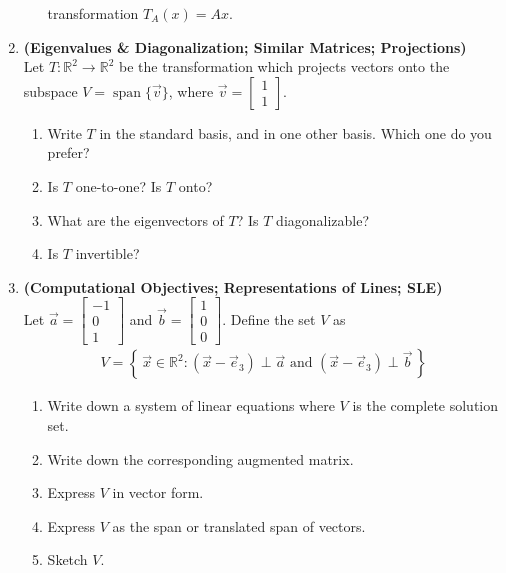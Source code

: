 \documentclass[red]{tutorial}
\newcommand{\R}{\mathbb{R}}
\newcommand{\mat}[1]{\begin{bmatrix} #1 %
\end{bmatrix}}
\DeclareMathOperator{\Span} {span}
\theoremstyle{definition}
\theoremstyle{theorem}
\begin{document}
\begin{tutorial}
\begin{enumerate}
\begin{enumerate}
          transformation $T_A(x) = Ax$.
      \end{enumerate}
    \item \textbf{(Eigenvalues \& Diagonalization; Similar Matrices;
      Projections)}\\
      Let $T\colon\R^2\to\R^2$ be the transformation which
      projects vectors onto the subspace $V=\Span\{\vec v\}$,
      where $\vec v = \mat{1\\1}$.
      \begin{enumerate}
        \item \label{q:standard_basis}
          Write $T$ in the standard basis, and in one other basis. Which one do
          you prefer?
        \item Is $T$ one-to-one? Is $T$ onto?
        \item What are the eigenvectors of $T$? Is $T$ diagonalizable?
        \item Is $T$ invertible?
      \end{enumerate}
    \item \textbf{(Computational Objectives; Representations of Lines;
      SLE)}\\
      Let $\vec a = \mat{-1\\0\\1}$ and $\vec b = \mat{1\\0\\0}$.
      Define the set $V$ as
      \begin{align*}
        V = \left\{\,\vec x\in \R^2: %
        (\vec x - \vec e_3)\perp \vec a \text{ and }
        (\vec x - \vec e_3)\perp \vec b \,\right\}
      \end{align*}
      \begin{enumerate}
        \item Write down a system of linear equations where
              $V$ is the complete solution set.
        \item Write down the corresponding augmented matrix.
        \item Express $V$ in vector form.
        \item Express $V$ as the span or translated span of
              vectors.
        \item Sketch $V$.
      \end{enumerate}
  \end{enumerate}
\end{tutorial}
\end{document}
